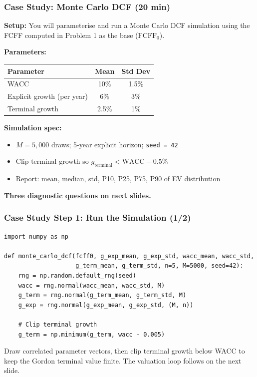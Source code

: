 \documentclass[9pt,t]{beamer}
\begin{document}
\begin{frame}
\frametitle{Case Study: Monte Carlo DCF (20 min)}

\textbf{Setup:} You will parameterise and run a Monte Carlo DCF simulation
using the FCFF computed in Problem 1 as the base ($\text{FCFF}_0$).

\medskip
\textbf{Parameters:}
\begin{center}
\begin{tabular}{lcc}
\toprule
Parameter & Mean & Std Dev \\
\midrule
WACC & 10\% & 1.5\% \\
Explicit growth (per year) & 6\% & 3\% \\
Terminal growth & 2.5\% & 1\% \\
\bottomrule
\end{tabular}
\end{center}

\medskip
\textbf{Simulation spec:}
\begin{itemize}
  \item $M = 5{,}000$ draws; 5-year explicit horizon; \texttt{seed = 42}
  \item Clip terminal growth so $g_{\text{terminal}} < \text{WACC} - 0.5\%$
  \item Report: mean, median, std, P10, P25, P75, P90 of EV distribution
\end{itemize}

\medskip
\textbf{Three diagnostic questions on next slides.}
\end{frame}

\begin{frame}[fragile]
\frametitle{Case Study Step 1: Run the Simulation (1/2)}

\begin{lstlisting}[basicstyle=\ttfamily\scriptsize]
import numpy as np

def monte_carlo_dcf(fcff0, g_exp_mean, g_exp_std, wacc_mean, wacc_std,
                    g_term_mean, g_term_std, n=5, M=5000, seed=42):
    rng = np.random.default_rng(seed)
    wacc = rng.normal(wacc_mean, wacc_std, M)
    g_term = rng.normal(g_term_mean, g_term_std, M)
    g_exp = rng.normal(g_exp_mean, g_exp_std, (M, n))

    # Clip terminal growth
    g_term = np.minimum(g_term, wacc - 0.005)
\end{lstlisting}

Draw correlated parameter vectors, then clip terminal growth below WACC to keep
the Gordon terminal value finite. The valuation loop follows on the next slide.
\end{frame}
\end{document}
